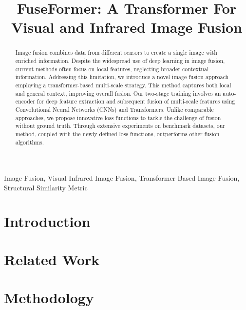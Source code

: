 \documentclass[conference]{IEEEtran}
\begin{document}
\title{FuseFormer: A Transformer For Visual and Infrared Image Fusion\\
}

\author{
\and
{}
}

\maketitle

\begin{abstract}
    Image fusion combines data from different sensors to create a single image with enriched information. Despite the widespread use of deep learning in image fusion, current methods often focus on local features, neglecting broader contextual information. Addressing this limitation, we introduce a novel image fusion approach employing a transformer-based multi-scale strategy. This method captures both local and general context, improving overall fusion. Our two-stage training involves an auto-encoder for deep feature extraction and subsequent fusion of multi-scale features using Convolutional Neural Networks (CNNs) and Transformers. Unlike comparable approaches, we propose innovative loss functions to tackle the challenge of fusion without ground truth. Through extensive experiments on benchmark datasets, our method, coupled with the newly defined loss functions, outperforms other fusion algorithms.
\end{abstract}

\begin{IEEEkeywords}
Image Fusion, Visual Infrared Image Fusion, Transformer Based Image Fusion, Structural Similarity Metric
\end{IEEEkeywords}


\section{Introduction}


\section{Related Work}


\section{Methodology}


 

\end{document}
